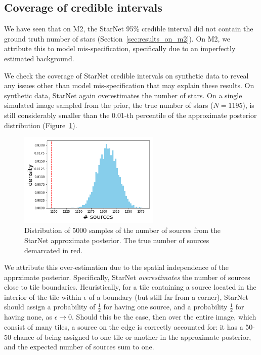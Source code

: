 \subsection{Coverage of credible intervals}

We have seen that on M2, the StarNet 95\% credible interval did not contain the ground truth number of stars (Section~\ref{sec:results_on_m2}).
On M2, we attribute this to model mis-specification, specifically due to an imperfectly
estimated background.

We check the coverage of StarNet credible intervals on synthetic data
to reveal any issues other than model mis-specification that may explain these results.
On synthetic data, StarNet again overestimates the number of stars.
On a single simulated image sampled from the prior,
the true number of stars ($N = 1195$),
is still considerably smaller than the 0.01-th percentile of
the approximate posterior distribution (Figure~\ref{fig:starnet_density}).


\begin{figure}[tb]
    \centering
    \includegraphics[width=0.6\textwidth]{./figures/coverage/starnet_histogram.png}
    \vspace{-0.4cm}
    \caption{Distribution of 5000 samples of the number of sources from the StarNet approximate posterior.
    The true number of sources demarcated in red. }
    \label{fig:starnet_density}
\end{figure}

We attribute this over-estimation due to the spatial independence of the apprximate posterior.
Specifically, StarNet \textit{overestimates} the number of sources close to tile boundaries.
Heuristically, for a tile containing
a source located in the interior of the tile
within $\epsilon$ of a boundary (but still far from a corner),
StarNet should assign a probability of $\frac{1}{2}$ for
having one source, and a probability $\frac{1}{2}$ for having none, as $\epsilon \rightarrow 0$.
Should this be the case, then over the entire image, which consist of many tiles,
a source on the edge is correctly accounted for: it has a 50-50 chance of being assigned to one tile or another
in the approximate posterior, and the expected number of sources sum to one.

